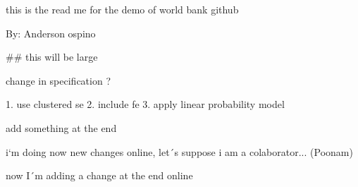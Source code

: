 this is the read me for the demo of world bank github

By: Anderson ospino

## this will be large



change in specification ?

1. use clustered se
2. include fe
3. apply linear probability model

add something at the end


i`m doing now new changes online, let´s suppose i am a colaborator... (Poonam)

now I´m adding a change at the end online
